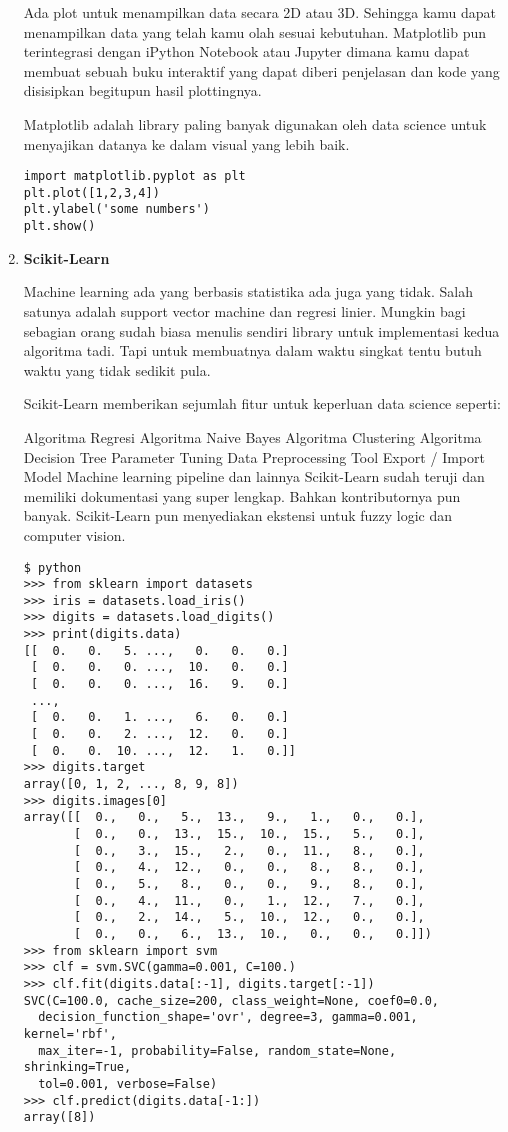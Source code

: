 \begin{enumerate}
Ada plot untuk menampilkan data secara 2D atau 3D. Sehingga kamu dapat menampilkan data yang telah kamu olah sesuai kebutuhan. Matplotlib pun terintegrasi dengan iPython Notebook atau Jupyter dimana kamu dapat membuat sebuah buku interaktif yang dapat diberi penjelasan dan kode yang disisipkan begitupun hasil plottingnya.

Matplotlib adalah library paling banyak digunakan oleh data science untuk menyajikan datanya ke dalam visual yang lebih baik.
\begin{lstlisting}
import matplotlib.pyplot as plt
plt.plot([1,2,3,4])
plt.ylabel('some numbers')
plt.show()
\end{lstlisting}
\item \textbf{Scikit-Learn}
\par Machine learning ada yang berbasis statistika ada juga yang tidak. Salah satunya adalah support vector machine dan regresi linier. Mungkin bagi sebagian orang sudah biasa menulis sendiri library untuk implementasi kedua algoritma tadi. Tapi untuk membuatnya dalam waktu singkat tentu butuh waktu yang tidak sedikit pula.

Scikit-Learn memberikan sejumlah fitur untuk keperluan data science seperti:

Algoritma Regresi
Algoritma Naive Bayes
Algoritma Clustering
Algoritma Decision Tree
Parameter Tuning
Data Preprocessing Tool
Export / Import Model
Machine learning pipeline
dan lainnya
Scikit-Learn sudah teruji dan memiliki dokumentasi yang super lengkap. Bahkan kontributornya pun banyak. Scikit-Learn pun menyediakan ekstensi untuk fuzzy logic dan computer vision.
 \begin{lstlisting}
$ python
>>> from sklearn import datasets
>>> iris = datasets.load_iris()
>>> digits = datasets.load_digits()
>>> print(digits.data)  
[[  0.   0.   5. ...,   0.   0.   0.]
 [  0.   0.   0. ...,  10.   0.   0.]
 [  0.   0.   0. ...,  16.   9.   0.]
 ...,
 [  0.   0.   1. ...,   6.   0.   0.]
 [  0.   0.   2. ...,  12.   0.   0.]
 [  0.   0.  10. ...,  12.   1.   0.]]
>>> digits.target
array([0, 1, 2, ..., 8, 9, 8])
>>> digits.images[0]
array([[  0.,   0.,   5.,  13.,   9.,   1.,   0.,   0.],
       [  0.,   0.,  13.,  15.,  10.,  15.,   5.,   0.],
       [  0.,   3.,  15.,   2.,   0.,  11.,   8.,   0.],
       [  0.,   4.,  12.,   0.,   0.,   8.,   8.,   0.],
       [  0.,   5.,   8.,   0.,   0.,   9.,   8.,   0.],
       [  0.,   4.,  11.,   0.,   1.,  12.,   7.,   0.],
       [  0.,   2.,  14.,   5.,  10.,  12.,   0.,   0.],
       [  0.,   0.,   6.,  13.,  10.,   0.,   0.,   0.]])
>>> from sklearn import svm
>>> clf = svm.SVC(gamma=0.001, C=100.)
>>> clf.fit(digits.data[:-1], digits.target[:-1])  
SVC(C=100.0, cache_size=200, class_weight=None, coef0=0.0,
  decision_function_shape='ovr', degree=3, gamma=0.001, kernel='rbf',
  max_iter=-1, probability=False, random_state=None, shrinking=True,
  tol=0.001, verbose=False)
>>> clf.predict(digits.data[-1:])
array([8])
\end{lstlisting}
\end{enumerate}